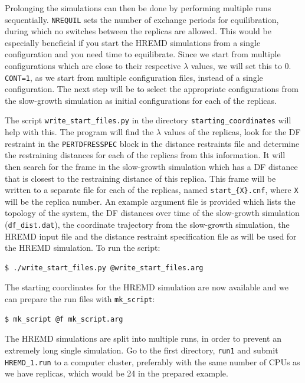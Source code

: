 Prolonging the simulations can then be done by performing multiple runs sequentially. 
\texttt{NREQUIL} sets the number of exchange periods for equilibration, during which no switches between the replicas are allowed. 
This would be especially beneficial if you start the HREMD simulations from a single configuration and you need time to equilibrate. 
Since we start from multiple configurations which are close to their respective $\lambda$ values, we will set this to 0. 
\texttt{CONT=1}, as we start from multiple configuration files, instead of a single configuration.
The next step will be to select the appropriate configurations from the slow-growth simulation as initial configurations for each of the replicas.

The script \texttt{write\_start\_files.py} in the directory \texttt{starting\_coordinates} will help with this. 
The program will find the $\lambda$ values of the replicas, look for the DF restraint in the \texttt{PERTDFRESSPEC} block in the distance restraints file and determine the restraining distances for each of the replicas from this information.
It will then search for the frame in the slow-growth simulation which has a DF distance that is closest to the restraining distance of this replica.
This frame will be written to a separate file for each of the replicas, named \texttt{start\_\{X\}.cnf}, where \texttt{X} will be the replica number. 
An example argument file is provided which lists the topology of the system, the DF distances over time of the slow-growth simulation (\texttt{df\_dist.dat}), the coordinate trajectory from the slow-growth simulation, the HREMD input file and the distance restraint specification file as will be used for the HREMD simulation. To run the script:
\begin{lstlisting}
$ ./write_start_files.py @write_start_files.arg 
\end{lstlisting}
The starting coordinates for the HREMD simulation are now available and we can prepare the run files with \texttt{mk\_script}:
\begin{lstlisting}
$ mk_script @f mk_script.arg
\end{lstlisting}
The HREMD simulations are split into multiple runs, in order to prevent an extremely long single simulation. 
Go to the first directory, \texttt{run1} and submit \texttt{HREMD\_1.run} to a computer cluster, preferably with the same number of CPUs as we have replicas, which would be 24 in the prepared example. 

